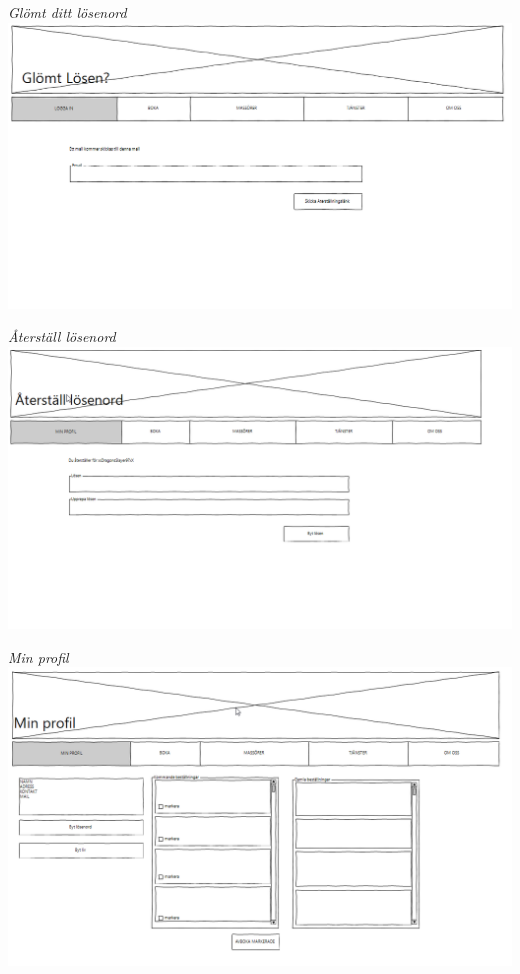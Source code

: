 \documentclass[11pt, titlepage, oneside, a4paper]{article}	%
\begin{document}
\begin{center}
    \textit{Glömt ditt lösenord}
    \includegraphics[width=1\textwidth]{../Bilder/Wireframe/glomt_losen}
    \newpage
    
    \textit{Återställ lösenord}
    \includegraphics[width=1\textwidth]{../Bilder/Wireframe/aterstall_losenord}
    
    \textit{Min profil}
    \includegraphics[width=1\textwidth]{../Bilder/Wireframe/min_profil}
    \newpage
    

\end{center}
\end{document}
